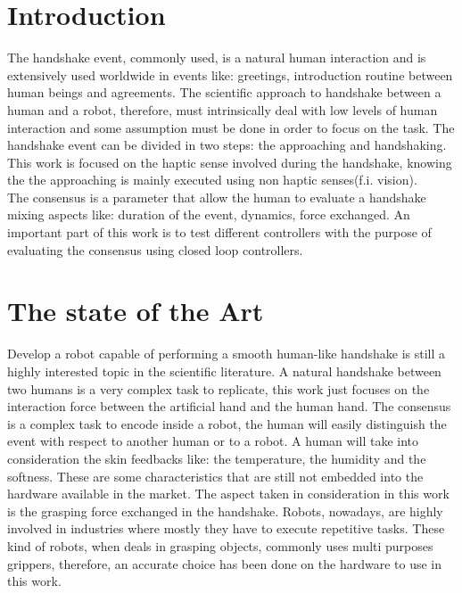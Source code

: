 \chapter*{Introduction}
The handshake event, commonly used, is a natural human interaction and is extensively used worldwide in events like: greetings, introduction routine between human beings and agreements. 
The scientific approach to handshake between a human and a robot, therefore, must intrinsically deal with low levels of human interaction and some assumption must be done in order to focus on the task.
The handshake event can be divided in two steps: the approaching and handshaking. This work is focused on the haptic sense involved during the handshake, knowing the the approaching is mainly executed using non haptic senses(f.i. vision).\\ The consensus is a parameter that allow the human to evaluate a handshake mixing aspects like: duration of the event, dynamics, force exchanged.
An important part of this work is to test different controllers with the purpose of evaluating the consensus using closed loop controllers. 
  


\chapter{The state of the Art}
Develop a robot capable of performing a smooth human-like handshake is still a highly interested topic in the scientific literature.
A natural handshake between two humans is a very complex task to replicate, this work just focuses on the interaction force between the artificial hand and the human hand.
The consensus is a complex task to encode inside a robot, the human will easily distinguish the event with respect to another human or to a robot. A human will take into consideration the skin feedbacks like: the temperature, the humidity and the softness. These are some characteristics that are still not embedded into the hardware available in the market. The aspect taken in consideration in this work is the grasping force exchanged in the handshake. 
Robots, nowadays, are highly involved in industries where mostly they have to execute repetitive tasks. These kind of robots, when deals in grasping objects, commonly uses multi purposes grippers\cite{multipurposegripper}, therefore, an accurate choice has been done on the hardware to use in this work. 


